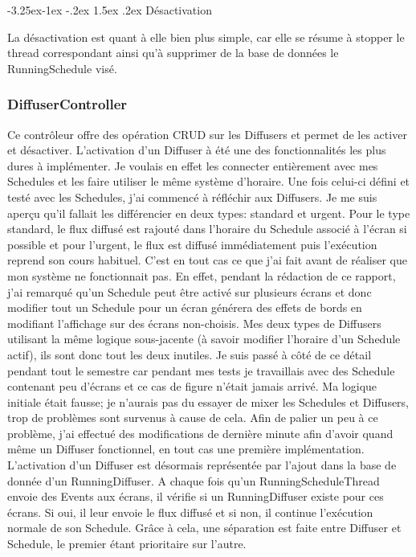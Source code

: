 \documentclass[french]{article}
\makeatletter
\renewcommand\paragraph{\@startsection{paragraph}{4}{\z@}%
                                     {-3.25ex\@plus -1ex \@minus -.2ex}%
                                     {1.5ex \@plus .2ex}%
                                     {\normalfont\normalsize\bfseries}}
\makeatother
\begin{document}



\paragraph{Désactivation}

La désactivation est quant à elle bien plus simple, car elle se résume à stopper le thread correspondant ainsi qu'à supprimer de la base de données le RunningSchedule visé.




\subsubsection{DiffuserController}

Ce contrôleur offre des opération CRUD sur les Diffusers et permet de les activer et désactiver. \newline
L'activation d'un Diffuser à été une des fonctionnalités les plus dures à implémenter. Je voulais en effet les connecter entièrement avec mes Schedules et les faire utiliser le même système d'horaire. Une fois celui-ci défini et testé avec les Schedules, j'ai commencé à réfléchir aux Diffusers. Je me suis aperçu qu'il fallait les différencier en deux types: standard et urgent. Pour le type standard, le flux diffusé est rajouté dans l'horaire du Schedule associé à l'écran si possible et pour l'urgent, le flux est diffusé immédiatement puis l'exécution reprend son cours habituel. \newline
C'est en tout cas ce que j'ai fait avant de réaliser que mon système ne fonctionnait pas. En effet, pendant la rédaction de ce rapport, j'ai remarqué qu'un Schedule peut être activé sur plusieurs écrans et donc modifier tout un Schedule pour un écran générera des effets de bords en modifiant l'affichage sur des écrans non-choisis. Mes deux types de Diffusers utilisant la même logique sous-jacente (à savoir modifier l'horaire d'un Schedule actif), ils sont donc tout les deux inutiles. Je suis passé à côté de ce détail pendant tout le semestre car pendant mes tests je travaillais avec des Schedule contenant peu d'écrans et ce cas de figure n'était jamais arrivé.\newline
Ma logique initiale était fausse; je n'aurais pas du essayer de mixer les Schedules et Diffusers, trop de problèmes sont survenus à cause de cela. Afin de palier un peu à ce problème, j'ai effectué des modifications de dernière minute afin d'avoir quand même un Diffuser fonctionnel, en tout cas une première implémentation. \newline
L'activation d'un Diffuser est désormais représentée par l'ajout dans la base de donnée d'un RunningDiffuser. A chaque fois qu'un RunningScheduleThread envoie des Events aux écrans, il vérifie si un RunningDiffuser existe pour ces écrans. Si oui, il leur envoie le flux diffusé et si non, il continue l'exécution normale de son Schedule. Grâce à cela, une séparation est faite entre Diffuser et Schedule, le premier étant prioritaire sur l'autre.
\end{document}
